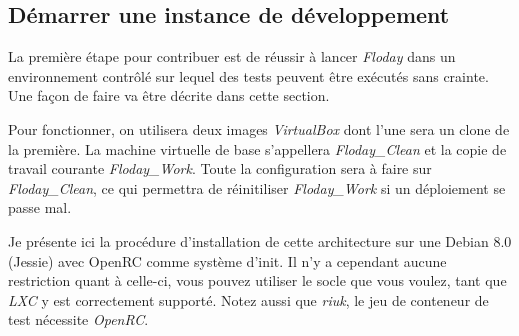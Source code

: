 \subsection{Démarrer une instance de développement}

La première étape pour contribuer est de réussir à lancer \emph{Floday} dans un environnement contrôlé sur lequel des tests peuvent être exécutés sans crainte.
Une façon de faire va être décrite dans cette section.

Pour fonctionner, on utilisera deux images \emph{VirtualBox} dont l'une sera un clone de la première. La machine virtuelle de base s'appellera \emph{Floday\_Clean} et la copie de travail courante \emph{Floday\_Work}.
Toute la configuration sera à faire sur \emph{Floday\_Clean}, ce qui permettra de réinitiliser \emph{Floday\_Work} si un déploiement se passe mal.

Je présente ici la procédure d'installation de cette architecture sur une Debian 8.0 (Jessie) avec OpenRC comme système d'init.
Il n'y a cependant aucune restriction quant à celle-ci, vous pouvez utiliser le socle que vous voulez, tant que \emph{LXC} y est correctement supporté.
Notez aussi que \emph{riuk}, le jeu de conteneur de test nécessite \emph{OpenRC}.

